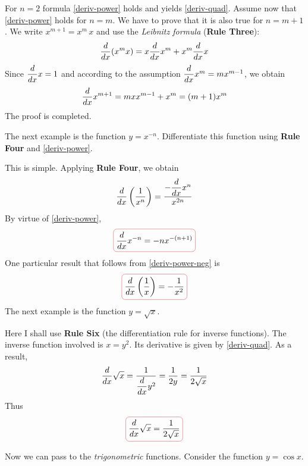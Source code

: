 \rdr For $n = 2$ formula \eqref{deriv-power} holds and yields \eqref{deriv-quad}. Assume now that \eqref{deriv-power} holds for $n = m$. We have to prove that it is also true for $n = m +1$. We write $x^{m+1} = x^{m}\, x$ and use the \emph{Leibnitz formula} (\textbf{Rule Three}):
\begin{equation*}%
\ddx (x^{m}x) = x \ddx x^{m} + x^{m} \ddx x
\end{equation*}
Since $\dfrac{d}{dx} x = 1$ and according to the assumption $\dfrac{d}{dx} x^{m} = m x^{m-1}$, we obtain 
\begin{equation*}%
\ddx x^{m+1} = m x x^{m-1} + x^{m} = (m+1) x^{m}
\end{equation*}
The proof is completed. 

\athr The next example is the function $y = x^{-n}$.
Differentiate this function using \textbf{Rule Four} and \eqref{deriv-power}.


\rdr This is simple. Applying \textbf{Rule Four}, we obtain
\begin{equation*}%
\ddx \left( \frac{1}{x^{n}} \right) = \dfrac{-\ddx x^{n}}{x^{2n}}
\end{equation*}
By virtue of \eqref{deriv-power},
\begin{equation}%
\boxed{\ddx x^{-n}  = -n x^{-(n+1)}}
\label{deriv-power-neg}
\end{equation}
\athr One particular result that follows from \eqref{deriv-power-neg} is
\begin{equation}%
\boxed{\ddx \left( \frac{1}{x} \right)  = - \frac{1}{x^{2}}}
\label{deriv-power-neg}
\end{equation}
The next example is the function $y = \sqrt{x}$.

\rdr Here I shall use \textbf{Rule Six} (the differentiation rule for inverse functions). The inverse function involved is $x =y^{2}$. Its derivative is given by \eqref{deriv-quad}. As a result,
\begin{equation*}%
\ddx \sqrt{x} = \dfrac{1}{\ddx y^{2}} = \dfrac{1}{2y} = \dfrac{1}{2\sqrt{x}}
\end{equation*}
Thus
\begin{equation}%
\boxed{\ddx  \sqrt{x} = \dfrac{1}{2\sqrt{x}}}
\label{deriv-power-neg}
\end{equation}


\athr Now we can pass to the \emph{trigonometric} functions. Consider the function $y = \cos x$.

